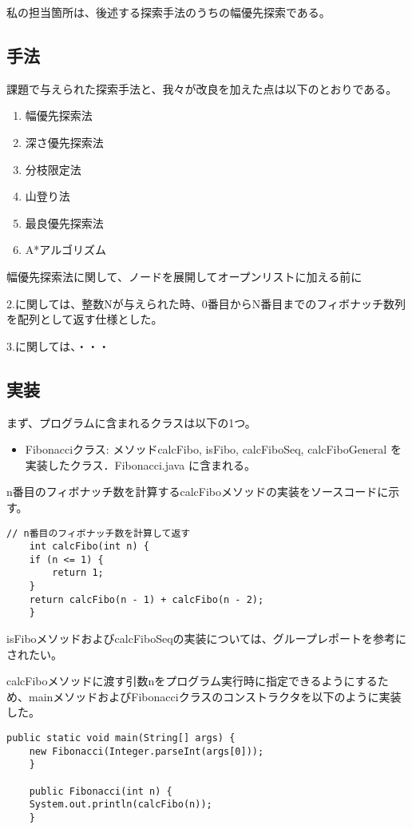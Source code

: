 \documentclass{jarticle}
\begin{document}
私の担当箇所は、後述する探索手法のうちの幅優先探索である。
\subsection{手法}
課題で与えられた探索手法と、我々が改良を加えた点は以下のとおりである。

\begin{enumerate}
\item 幅優先探索法
\item 深さ優先探索法
\item 分枝限定法
\item 山登り法
\item 最良優先探索法
\item A*アルゴリズム
\end{enumerate}

幅優先探索法に関して、ノードを展開してオープンリストに加える前に

2.に関しては、整数Nが与えられた時、0番目からN番目までのフィボナッチ数列を配列として返す仕様とした。

3.に関しては、・・・
\subsection{実装}

まず、プログラムに含まれるクラスは以下の1つ。
\begin{itemize}
\item Fibonacciクラス: メソッドcalcFibo, isFibo, calcFiboSeq, calcFiboGeneral を実装したクラス．Fibonacci.java に含まれる。
\end{itemize}

n番目のフィボナッチ数を計算するcalcFiboメソッドの実装をソースコードに示す。

\begin{lstlisting}[caption=calcFiboメソッド,label=src:calcFibo]
    // n番目のフィボナッチ数を計算して返す
    int calcFibo(int n) {
	if (n <= 1) {
	    return 1;
	}
	return calcFibo(n - 1) + calcFibo(n - 2);
    }
\end{lstlisting}

isFiboメソッドおよびcalcFiboSeqの実装については、グループレポートを参考にされたい。

calcFiboメソッドに渡す引数nをプログラム実行時に指定できるようにするため、mainメソッドおよびFibonacciクラスのコンストラクタを以下のように実装した。
\begin{lstlisting}[caption=mainメソッドとコンストラクタ,label=src:main]
    public static void main(String[] args) {
	new Fibonacci(Integer.parseInt(args[0]));
    }

    public Fibonacci(int n) {
	System.out.println(calcFibo(n));
    }
\end{lstlisting}
\end{document}
